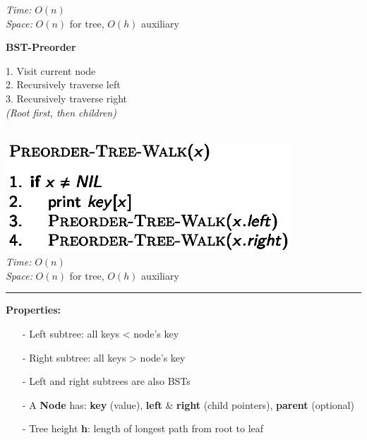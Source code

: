 {\begin{minipage}[t]{1\textwidth}
\begin{minipage}[t]{0.19\textwidth}
        \textit{Time:} \(O(n)\)\\
        \textit{Space:} \(O(n)\) for tree, \(O(h)\) auxiliary
    \end{minipage}
    \hfill
    \begin{minipage}[t]{0.19\textwidth}
        \centering
        \textbf{\scriptsize BST-Preorder}\\[2pt]
       \tiny
        \begin{minipage}[t]{\textwidth}
           \tiny
            1. Visit current node\\
            2. Recursively traverse left\\
            3. Recursively traverse right\\
            \textit{(Root first, then children)}
        \end{minipage}\\[4pt]
        \includegraphics[width=0.8\textwidth]{images/bst-preorder.png}\\
        \textit{Time:} \(O(n)\)\\
        \textit{Space:} \(O(n)\) for tree, \(O(h)\) auxiliary
        \begin{minipage}[t]{1.6\textwidth}
        \hrule
        \end{minipage}
        \vspace{2pt}
        \textbf{Properties:}\\
        \begin{minipage}[t]{1.6\textwidth}
            \begin{itemize}
            \item[-] Left subtree: all keys < node's key
            \item[-] Right subtree: all keys > node's key
            \item[-] Left and right subtrees are also BSTs
            \item[-] A \textbf{Node} has: \textbf{key} (value), \textbf{left} \& \textbf{right} (child pointers), \textbf{parent} (optional)
            \item[-] Tree height \textbf{h}: length of longest path from root to leaf

\end{itemize}
\end{minipage}
\end{minipage}
\end{minipage}}
